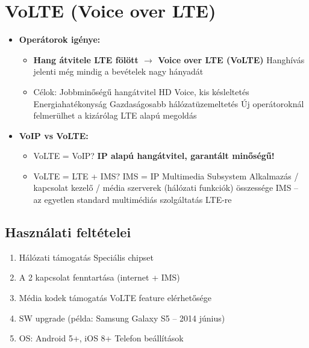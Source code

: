 \documentclass[10pt,a4paper]{article}
\begin{document}
\section{VoLTE (Voice over LTE)}
\begin{itemize}
	\item \textbf{Operátorok igénye:}
\begin{itemize}
	\item \textbf{Hang átvitele LTE fölött $\rightarrow$ Voice over LTE (VoLTE)}
\subitem Hanghívás jelenti még mindig a bevételek nagy hányadát
\item Célok:
\subitem Jobbminőségű hangátvitel
\subsubitem HD Voice, kis késleltetés
\subitem Energiahatékonyság
\subitem Gazdaságosabb hálózatüzemeltetés
\subsubitem Új operátoroknál felmerülhet a kizárólag LTE alapú megoldás
\end{itemize}
\item \textbf{VoIP vs VoLTE:}
\begin{itemize}
	\item VoLTE = VoIP?
\textbf{	\subitem IP alapú hangátvitel, garantált minőségű!}
\item VoLTE = LTE + IMS?
\subitem IMS = IP Multimedia Subsystem
\subsubitem Alkalmazás / kapcsolat kezelő / média szerverek (hálózati funkciók)
összessége
\subitem IMS – az egyetlen standard multimédiás szolgáltatás LTE-re
\end{itemize}
\end{itemize}
\subsection{Használati feltételei}
\begin{enumerate}
	\item Hálózati támogatás
	\subitem Speciális chipset
	\item A 2 kapcsolat fenntartása (internet + IMS)
	\item Média kodek támogatás
	\subitem VoLTE feature elérhetősége
	\item SW upgrade
	(példa: Samsung Galaxy S5 – 2014 június)
	\item OS: Android 5+, iOS 8+
	\subitem Telefon beállítások
\end{enumerate}
\end{document}
